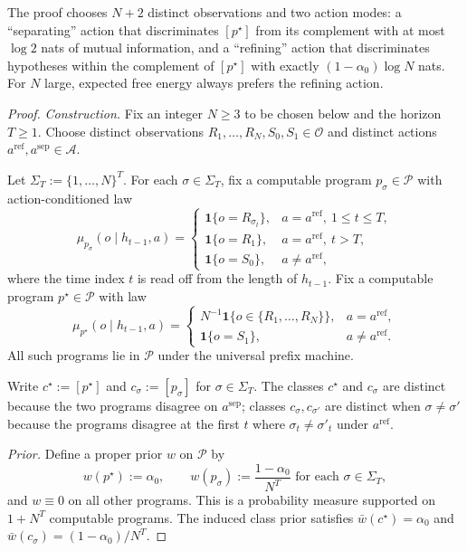 \documentclass[11pt]{article}
\theoremstyle{definition}
\theoremstyle{remark}
\newcommand{\Acal}{\mathcal{A}}
\newcommand{\Ocal}{\mathcal{O}}
\newcommand{\Pcal}{\mathcal{P}}
\newcommand{\one}{\mathbf{1}}
\begin{document}
The proof chooses $N+2$ distinct observations and two action modes: a ``separating'' action that discriminates $[p^\star]$ from its complement with at most $\log 2$ nats of mutual information, and a ``refining'' action that discriminates hypotheses within the complement of $[p^\star]$ with exactly $(1-\alpha_0)\log N$ nats. For $N$ large, expected free energy always prefers the refining action.

\begin{proof}
\emph{Construction.} Fix an integer $N\ge 3$ to be chosen below and the horizon $T\ge 1$. Choose distinct observations $R_1,\dots,R_N,S_0,S_1\in\Ocal$ and distinct actions $a^{\mathrm{ref}},a^{\mathrm{sep}}\in\Acal$.

Let $\Sigma_T:=\{1,\dots,N\}^T$. For each $\sigma\in\Sigma_T$, fix a computable program $p_\sigma\in\Pcal$ with action-conditioned law
\[
\mu_{p_\sigma}(o\mid h_{t-1},a)
=
\begin{cases}
\one\{o=R_{\sigma_t}\}, & a=a^{\mathrm{ref}},\ 1\le t\le T,\\
\one\{o=R_1\},         & a=a^{\mathrm{ref}},\ t>T,\\
\one\{o=S_0\},         & a\neq a^{\mathrm{ref}},
\end{cases}
\]
where the time index $t$ is read off from the length of $h_{t-1}$. Fix a computable program $p^\star\in\Pcal$ with law
\[
\mu_{p^\star}(o\mid h_{t-1},a)
=
\begin{cases}
N^{-1}\one\{o\in\{R_1,\dots,R_N\}\}, & a=a^{\mathrm{ref}},\\
\one\{o=S_1\},                        & a\neq a^{\mathrm{ref}}.
\end{cases}
\]
All such programs lie in $\Pcal$ under the universal prefix machine.

Write $c^\star:=[p^\star]$ and $c_\sigma:=[p_\sigma]$ for $\sigma\in\Sigma_T$. The classes $c^\star$ and $c_\sigma$ are distinct because the two programs disagree on $a^{\mathrm{sep}}$; classes $c_\sigma,c_{\sigma'}$ are distinct when $\sigma\neq\sigma'$ because the programs disagree at the first $t$ where $\sigma_t\neq\sigma'_t$ under $a^{\mathrm{ref}}$.

\emph{Prior.} Define a proper prior $w$ on $\Pcal$ by
\[
w(p^\star):=\alpha_0,\qquad w(p_\sigma):=\frac{1-\alpha_0}{N^T}\text{ for each }\sigma\in\Sigma_T,
\]
and $w\equiv 0$ on all other programs. This is a probability measure supported on $1+N^T$ computable programs. The induced class prior satisfies $\bar w(c^\star)=\alpha_0$ and $\bar w(c_\sigma)=(1-\alpha_0)/N^T$.


\end{proof}
\end{document}
